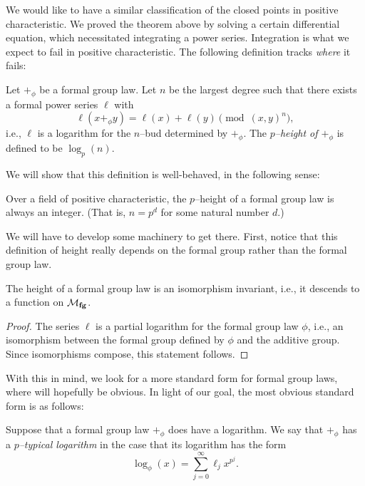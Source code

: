 We would like to have a similar classification of the closed points in positive characteristic.  We proved the theorem above by solving a certain differential equation, which necessitated integrating a power series.  Integration is what we expect to fail in positive characteristic.  The following definition tracks \emph{where} it fails:
\begin{definition}
Let $+_\phi$ be a formal group law.  Let $n$ be the largest degree such that there exists a formal power series $\ell$ with \[\ell(x +_\phi y) = \ell(x) + \ell(y) \pmod{(x, y)^{n}},\] i.e., $\ell$ is a logarithm for the $n$--bud determined by $+_\phi$.  The \textit{$p$--height of $+_\phi$} is defined to be $\log_p(n)$.
\end{definition}

We will show that this definition is well-behaved, in the following sense:
\begin{lemma}\label{FGLHeightIsAnInteger}
Over a field of positive characteristic, the $p$--height of a formal group law is always an integer.  (That is, $n = p^d$ for some natural number $d$.)
\end{lemma}
\noindent We will have to develop some machinery to get there.  First, notice that this definition of height really depends on the formal group rather than the formal group law.

\begin{lemma}
The height of a formal group law is an isomorphism invariant, i.e., it descends to a function on $\mathcal{M}_{\mathbf{fg}}$.
\end{lemma}
\begin{proof}
The series $\ell$ is a partial logarithm for the formal group law $\phi$, i.e., an isomorphism between the formal group defined by $\phi$ and the additive group.  Since isomorphisms compose, this statement follows.
\end{proof}

With this in mind, we look for a more standard form for formal group laws, where  will hopefully be obvious.  In light of our goal, the most obvious standard form is as follows:
\begin{definition}\label{DefnpTypicalLog}
Suppose that a formal group law $+_\phi$ does have a logarithm.  We say that $+_\phi$ has a \textit{$p$--typical logarithm} in the case that its logarithm has the form \[\log_\phi(x) = \sum_{j=0}^\infty \ell_j x^{p^j}.\]
\end{definition}

